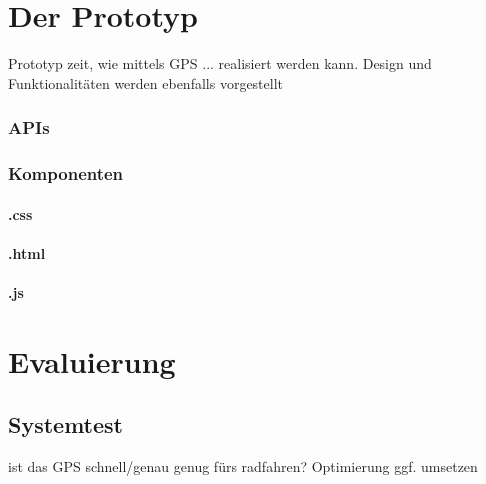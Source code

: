 \chapter{Der Prototyp}
Prototyp zeit, wie mittels GPS ... realisiert werden kann.
Design und Funktionalitäten werden ebenfalls vorgestellt
\subsection{APIs}
\subsection{Komponenten}
\subsubsection*{.css}
\subsubsection*{.html}
\subsubsection*{.js}
%
%
\chapter{Evaluierung}
\section{Systemtest}
ist das GPS schnell/genau genug fürs radfahren?
Optimierung ggf. umsetzen
